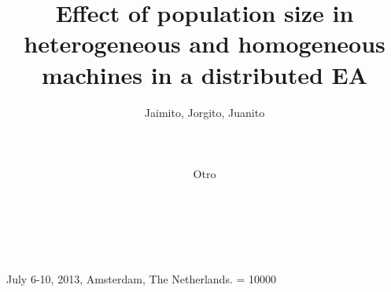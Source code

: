 \documentclass{sig-alternate}
\begin{document}
%
 {July 6-10, 2013, Amsterdam, The Netherlands.}
    \widowpenalty = 10000

\title{Effect of population size in heterogeneous and homogeneous machines in a distributed EA}

%
%
%
%
%


 \author{
 \alignauthor
 Jaimito, Jorgito, Juanito\\
        \\
        \\
        \\
 \alignauthor
 Otro\\
 \\
 \\
 \\
 }

\end{document}

